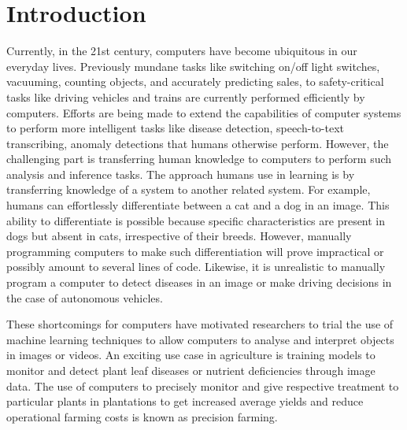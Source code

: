\chapter{Introduction}
\label{cha:Introduction}



Currently, in the 21st century, computers have become ubiquitous in our everyday lives. Previously mundane tasks like switching on/off light switches, vacuuming, counting objects, and accurately predicting sales, to safety-critical tasks like driving vehicles and trains are currently performed efficiently by computers. Efforts are being made to extend the capabilities of computer systems to perform more intelligent tasks like disease detection, speech-to-text transcribing, anomaly detections that humans otherwise perform. However, the challenging part is transferring human knowledge to computers to perform such analysis and inference tasks. The approach humans use in learning is by transferring knowledge of a system to another related system. For example, humans can effortlessly differentiate between a cat and a dog in an image. This ability to differentiate is possible because specific characteristics are present in dogs but absent in cats, irrespective of their breeds. However, manually programming computers to make such differentiation will prove impractical or possibly amount to several lines of code. Likewise, it is unrealistic to manually program a computer to detect diseases in an image or make driving decisions in the case of autonomous vehicles. 

These shortcomings for computers have motivated researchers to trial the use of machine learning techniques to allow computers to analyse and interpret objects in images or videos. An exciting use case in agriculture is training models to monitor and detect plant leaf diseases or nutrient deficiencies through image data. The use of computers to precisely monitor and give respective treatment to particular plants in plantations to get increased average yields and reduce operational farming costs is known as precision farming. 

